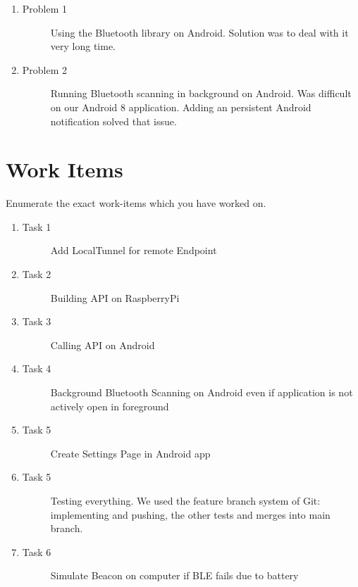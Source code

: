\documentclass[
10pt, %
a4paper, %
oneside, %
headinclude,footinclude, %
BCOR5mm, %
]{scrartcl}
\begin{document}
\begin{enumerate}
\item 
	\begin{description}
	\item[Problem 1] Using the Bluetooth library on Android. Solution was to deal with it very long time.
	\end{description}
	\item 
	\begin{description}
	\item[Problem 2] Running Bluetooth scanning in background on Android. Was difficult on our Android 8 application. Adding an persistent Android notification solved that issue.
	\end{description}
\end{enumerate}

\section{Work Items}
Enumerate the exact work-items which you have worked on. 
\begin{enumerate}
\item 
	\begin{description}
	\item[Task 1] Add LocalTunnel for remote Endpoint
	\end{description}
	\item 
	\begin{description}
		\item[Task 2] Building API on RaspberryPi
	\end{description}
	\item 
	\begin{description}
		\item[Task 3] Calling API on Android
	\end{description}
	\item 
	\begin{description}
		\item[Task 4] Background Bluetooth Scanning on Android even if application is not actively open in foreground
	\end{description}
	\item 
	\begin{description}
		\item[Task 5] Create Settings Page in Android app
	\end{description}
	\item 
	\begin{description}
		\item[Task 5] Testing everything. We used the feature branch system of Git: implementing and pushing, the other tests and merges into main branch.
	\end{description}
	\item 
	\begin{description}
		\item[Task 6] Simulate Beacon on computer if BLE fails due to battery 
	\end{description}
\end{enumerate}
\end{document}
